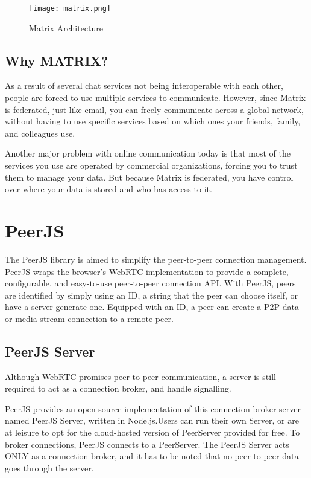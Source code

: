 \begin{figure}[h]
    \begin{center}
        \texttt{[image: matrix.png]}
    \end{center}
    \caption{Matrix Architecture}
    \label{fig:matrix}
\end{figure}

\subsection{Why MATRIX?}

As a result of several chat services not being interoperable with each other, people are 
forced to use multiple services to communicate.
However, since Matrix is federated, just like email, you can freely communicate across a 
global network, without having to use specific services based on which ones your friends, 
family, and colleagues use.

Another major problem with online communication today is that most of the services you
use are operated by commercial organizations, forcing you to trust them to manage your data.
But because Matrix is federated, you have control over where your data is stored and who has access to it.~\cite{RumaWhyMatrix} 

\section{PeerJS}

The PeerJS library is aimed to simplify the peer-to-peer connection management. 
PeerJS wraps the browser's WebRTC implementation to provide a complete, configurable, 
and easy-to-use peer-to-peer connection API. 
With PeerJS, peers are identified by simply using an ID, a string that the peer 
can choose itself, or have a server generate one. 
Equipped with an ID, a peer can create a P2P data or media stream connection to a remote peer.~\cite{PeerJSsimplifiesWebRTC}

\subsection{PeerJS Server}

Although WebRTC promises peer-to-peer communication, a server is still required to 
act as a connection broker, and handle signalling.

PeerJS provides an open source implementation of this connection broker 
server named PeerJS Server, written in Node.js.Users can run their own Server, 
or are at leisure to opt for the cloud-hosted version of PeerServer provided for free.
To broker connections, PeerJS connects to a PeerServer. The PeerJS Server acts ONLY as 
a connection broker, and it has to be noted that no peer-to-peer data goes through the server.~\cite{TamingWebRTCwithPeerJS}

